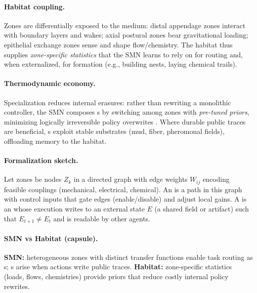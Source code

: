 \paragraph{Habitat coupling.}
Zones are differentially exposed to the medium: distal appendage zones interact with boundary layers and wakes; axial postural zones bear gravitational loading; epithelial exchange zones sense and shape flow/chemistry.
The habitat thus supplies \emph{zone-specific statistics} that the SMN learns to rely on for \OAP{} routing and, when externalized, for \TAP{} formation (e.g., building nests, laying chemical trails).

\paragraph{Thermodynamic economy.}
Specialization reduces internal erasures: rather than rewriting a monolithic controller, the SMN composes \OAP{}s by switching among zones with \emph{pre-tuned priors}, minimizing logically irreversible policy overwrites \cite{Landauer1961Irreversibility,Bennett2003LandauerNotes}.
Where durable public traces are beneficial, \TAP{}s exploit stable substrates (mud, fiber, pheromonal fields), offloading memory to the habitat.

\paragraph{Formalization sketch.}
Let zones be nodes $Z_k$ in a directed graph with edge weights $W_{ij}$ encoding feasible couplings (mechanical, electrical, chemical).
An \OAP{} is a path in this graph with control inputs that gate edges (enable/disable) and adjust local gains.
A \TAP{} is an \OAP{} whose execution writes to an external state $E$ (a shared field or artifact) such that $E_{t+1}\neq E_t$ and is readable by other agents.

\paragraph{SMN vs Habitat (capsule).}
\textbf{SMN:} heterogeneous zones with distinct transfer functions enable task routing as \OAP{}s; \TAP{}s arise when actions write public traces.
\textbf{Habitat:} zone-specific statistics (loads, flows, chemistries) provide priors that reduce costly internal policy rewrites.



